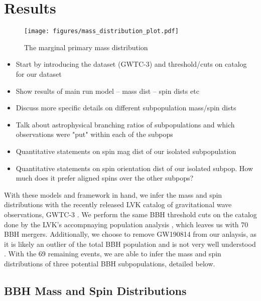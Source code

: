 \section{Results} \label{sec:results}

\begin{figure*}[ht!]
    \begin{centering}
        \texttt{[image: figures/mass\_distribution\_plot.pdf]}
        \caption{The marginal primary mass distribution}
        \label{fig:mass_distribution}
    \end{centering}
\end{figure*}


\begin{itemize}
    \item Start by introducing the dataset (GWTC-3) and threshold/cuts on catalog for our dataset
    \item Show results of main run model -- mass dist -- spin dists etc
    \item Discuss more specific details on different subpopulation mass/spin dists
    \item Talk about astrophysical branching ratios of subpopulations and which observations were "put" within each of the subpops
    \item Quantitative statements on spin mag dist of our isolated subpopulation
    \item Quantitative statements on spin orientation dist of our isolated subpop. How much does it prefer aligned spins over the other subpops?
\end{itemize}

With these models and framework in hand, we infer the mass and spin distributions with the recently released LVK catalog of gravitational wave observations, GWTC-3 . We perform the same BBH threshold cuts on the catalog done by the LVK's accompnaying population analysis , which leaves us with 70 BBH mergers. Additionally, we choose to remove GW190814 from our anlaysis, as it is likely an outlier of the total BBH population and is not very well understood . With the 69 remaining events, we are able to infer the mass and spin distributions of three potential BBH subpopulations, detailed below. 

\subsection{BBH Mass and Spin Distributions}

